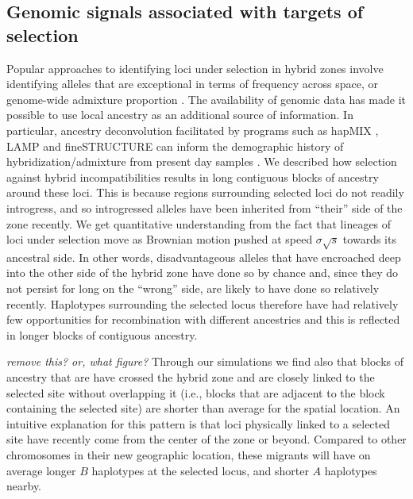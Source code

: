 \documentclass[11pt,letterpaper]{article}
\newcommand{\yb}[1]{{\em \color{magenta} #1}}
\begin{document}
\subsection*{Genomic signals associated with targets of selection}

Popular approaches to identifying loci under selection in hybrid zones 
involve identifying alleles that are exceptional in terms of frequency across space, or genome-wide admixture proportion \citep{Porter1997,Gompert2012}.  
The availability of genomic data has made it possible to use local ancestry as an additional source of information. 
In particular, ancestry deconvolution facilitated by programs such as  hapMIX \citep{Price2009}, LAMP \citep{Sankararaman2008} and fineSTRUCTURE \citep{Lawson2012} 
can inform the demographic history of hybridization/admixture from present day samples \citep[e.g. ][]{Hellenthal2014}. 
We described how selection against hybrid incompatibilities  
results in long contiguous blocks of ancestry around these loci. 
This is because regions surrounding selected loci do not readily introgress, 
and so introgressed alleles have been inherited from ``their'' side of the zone recently. %
We get quantitative understanding from the fact that lineages of
loci under selection move as Brownian motion pushed at speed $\sigma \sqrt{s}$ towards its ancestral side.
In other words, disadvantageous alleles that have encroached deep into the other side of the hybrid zone have done so by chance and, since they do not persist for long on the ``wrong'' side, are likely to have done so relatively recently. Haplotypes surrounding the selected locus therefore have had relatively few opportunities for recombination with different ancestries and this is reflected in longer blocks of contiguous ancestry.

\yb{remove this? or, what figure?}
Through our simulations we find also that blocks of ancestry that are have crossed the hybrid zone and are closely linked to the selected site without overlapping it (i.e., blocks that are adjacent to the block containing the selected site) are shorter than average for the spatial location. 
An intuitive explanation for this pattern is that loci physically linked to a selected site have recently come from the center of the zone or beyond. 
Compared to other chromosomes in their new geographic location, these migrants will have on average longer $B$ haplotypes at the selected locus, and shorter $A$ haplotypes nearby. 
\end{document}
